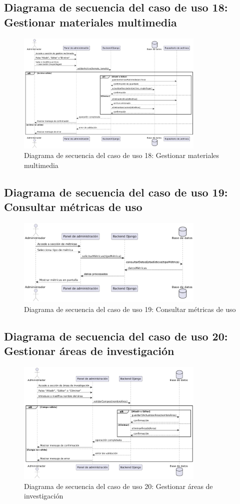\subsection{Diagrama de secuencia del caso de uso 18: Gestionar materiales multimedia}
\begin{figure}[H]
    \centering
    \includegraphics[width=0.8\textwidth]{figs/caso18.png}
    \caption{Diagrama de secuencia del caso de uso 18: Gestionar materiales multimedia}
\end{figure}

\subsection{Diagrama de secuencia del caso de uso 19: Consultar métricas de uso}
\begin{figure}[H]
    \centering
    \includegraphics[width=0.8\textwidth]{figs/caso19.png}
    \caption{Diagrama de secuencia del caso de uso 19: Consultar métricas de uso}
\end{figure}

\subsection{Diagrama de secuencia del caso de uso 20: Gestionar áreas de investigación}
\begin{figure}[H]
    \centering
    \includegraphics[width=0.8\textwidth]{figs/caso20.png}
    \caption{Diagrama de secuencia del caso de uso 20: Gestionar áreas de investigación}
\end{figure}